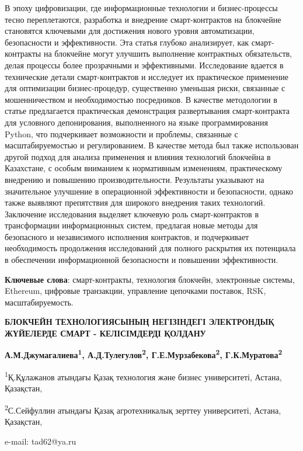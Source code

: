 В эпоху цифровизации, где информационные технологии и бизнес-процессы
тесно переплетаются, разработка и внедрение смарт-контрактов на
блокчейне становятся ключевыми для достижения нового уровня
автоматизации, безопасности и эффективности. Эта статья глубоко
анализирует, как смарт-контракты на блокчейне могут улучшить выполнение
контрактных обязательств, делая процессы более прозрачными и
эффективными. Исследование вдается в технические детали смарт-контрактов
и исследует их практическое применение для оптимизации бизнес-процедур,
существенно уменьшая риски, связанные с мошенничеством и необходимостью
посредников. В качестве методологии в статье предлагается практическая
демонстрация развертывания смарт-контракта для условного депонирования,
выполненного на языке программирования Python, что подчеркивает
возможности и проблемы, связанные с масштабируемостью и регулированием.
В качестве метода был также использован другой подход для анализа
применения и влияния технологий блокчейна в Казахстане, с особым
вниманием к нормативным изменениям, практическому внедрению и повышению
производительности. Результаты указывают на значительное улучшение в
операционной эффективности и безопасности, однако также выявляют
препятствия для широкого внедрения таких технологий. Заключение
исследования выделяет ключевую роль смарт-контрактов в трансформации
информационных систем, предлагая новые методы для безопасного и
независимого исполнения контрактов, и подчеркивает необходимость
продолжения исследований для полного раскрытия их потенциала в
обеспечении информационной безопасности и повышении эффективности.

\textbf{Ключевые слова}: смарт-контракты, технология блокчейн,
электронные системы, Ethereum, цифровые транзакции, управление цепочками
поставок, RSK, масштабируемость.

\textbf{БЛОКЧЕЙН ТЕХНОЛОГИЯСЫНЫҢ НЕГІЗІНДЕГІ ЭЛЕКТРОНДЫҚ ЖҮЙЕЛЕРДЕ СМАРТ
- КЕЛІСІМДЕРДІ ҚОЛДАНУ}

\textbf{А.М.Джумагалиева\textsuperscript{1},
А.Д.Тулегулов\textsuperscript{2}, Г.Е.Мурзабекова\textsuperscript{2},
Г.К.Муратова\textsuperscript{2}}

\textsuperscript{1}Қ.Құлажанов атындағы Қазақ технология және бизнес
университеті, Астана, Қазақстан,

\textsuperscript{2}С.Сейфуллин атындағы Қазақ агротехникалық зерттеу
университеті, Астана, Қазақстан,

e-mail: tad62@ya.ru


